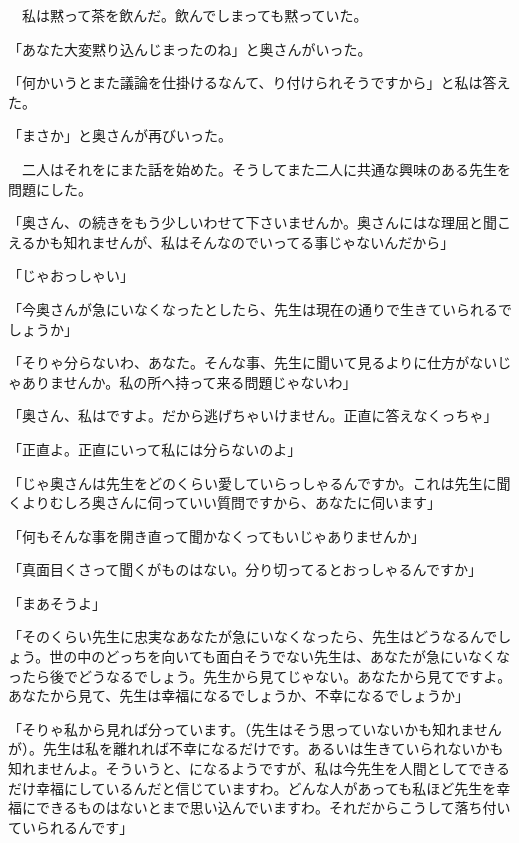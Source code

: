 \documentclass[a4j,onecolumn]{tarticle}
\begin{document}
　私は黙って茶を飲んだ。\hbox{}飲んでしまっても黙っていた。\hbox{}\par{}
「あなた大変黙り込んじまったのね」と奥さんがいった。\hbox{}\par{}
「何かいうとまた議論を仕掛けるなんて、\hbox{}り付けられそうですから」と私は答えた。\hbox{}\par{}
「まさか」と奥さんが再びいった。\hbox{}\par{}
　二人はそれをにまた話を始めた。\hbox{}そうしてまた二人に共通な興味のある先生を問題にした。\hbox{}\par{}
「奥さん、\hbox{}の続きをもう少しいわせて下さいませんか。\hbox{}奥さんにはな理屈と聞こえるかも知れませんが、\hbox{}私はそんなのでいってる事じゃないんだから」\par{}
「じゃおっしゃい」\par{}
「今奥さんが急にいなくなったとしたら、\hbox{}先生は現在の通りで生きていられるでしょうか」\par{}
「そりゃ分らないわ、\hbox{}あなた。\hbox{}そんな事、\hbox{}先生に聞いて見るよりに仕方がないじゃありませんか。\hbox{}私の所へ持って来る問題じゃないわ」\par{}
「奥さん、\hbox{}私はですよ。\hbox{}だから逃げちゃいけません。\hbox{}正直に答えなくっちゃ」\par{}
「正直よ。\hbox{}正直にいって私には分らないのよ」\par{}
「じゃ奥さんは先生をどのくらい愛していらっしゃるんですか。\hbox{}これは先生に聞くよりむしろ奥さんに伺っていい質問ですから、\hbox{}あなたに伺います」\par{}
「何もそんな事を開き直って聞かなくってもいじゃありませんか」\par{}
「真面目くさって聞くがものはない。\hbox{}分り切ってるとおっしゃるんですか」\par{}
「まあそうよ」\par{}
「そのくらい先生に忠実なあなたが急にいなくなったら、\hbox{}先生はどうなるんでしょう。\hbox{}世の中のどっちを向いても面白そうでない先生は、\hbox{}あなたが急にいなくなったら後でどうなるでしょう。\hbox{}先生から見てじゃない。\hbox{}あなたから見てですよ。\hbox{}あなたから見て、\hbox{}先生は幸福になるでしょうか、\hbox{}不幸になるでしょうか」\par{}
「そりゃ私から見れば分っています。\hbox{}（先生はそう思っていないかも知れませんが）。\hbox{}先生は私を離れれば不幸になるだけです。\hbox{}あるいは生きていられないかも知れませんよ。\hbox{}そういうと、\hbox{}になるようですが、\hbox{}私は今先生を人間としてできるだけ幸福にしているんだと信じていますわ。\hbox{}どんな人があっても私ほど先生を幸福にできるものはないとまで思い込んでいますわ。\hbox{}それだからこうして落ち付いていられるんです」\par{}
\end{document}

